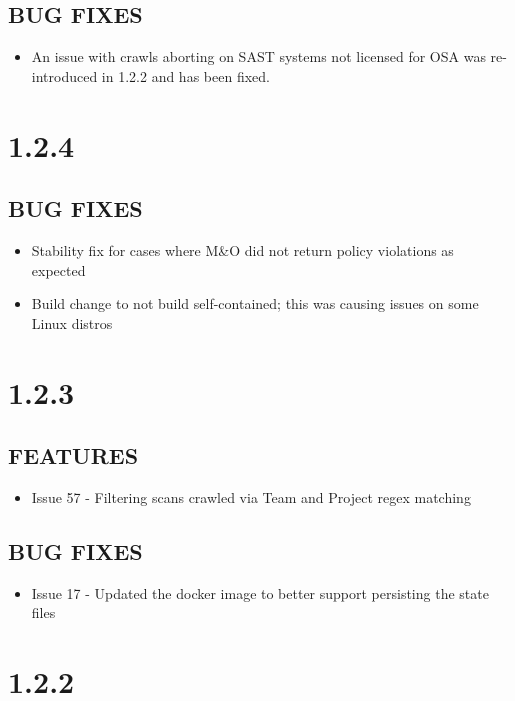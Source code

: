 \subsection*{BUG FIXES}
    \begin{itemize}
        \item An issue with crawls aborting on SAST systems not licensed for OSA was re-introduced in 1.2.2 and has been fixed.
    \end{itemize}

\section{1.2.4}
\subsection*{BUG FIXES}
    \begin{itemize}
        \item Stability fix for cases where M\&O did not return policy violations as expected
        \item Build change to not build self-contained; this was causing issues on some Linux distros
    \end{itemize}


\section{1.2.3}
\subsection*{FEATURES}
    \begin{itemize}
        \item Issue 57 - Filtering scans crawled via Team and Project regex matching
    \end{itemize}
\subsection*{BUG FIXES}
    \begin{itemize}
        \item Issue 17 - Updated the docker image to better support persisting the state files
    \end{itemize}


\section{1.2.2}
